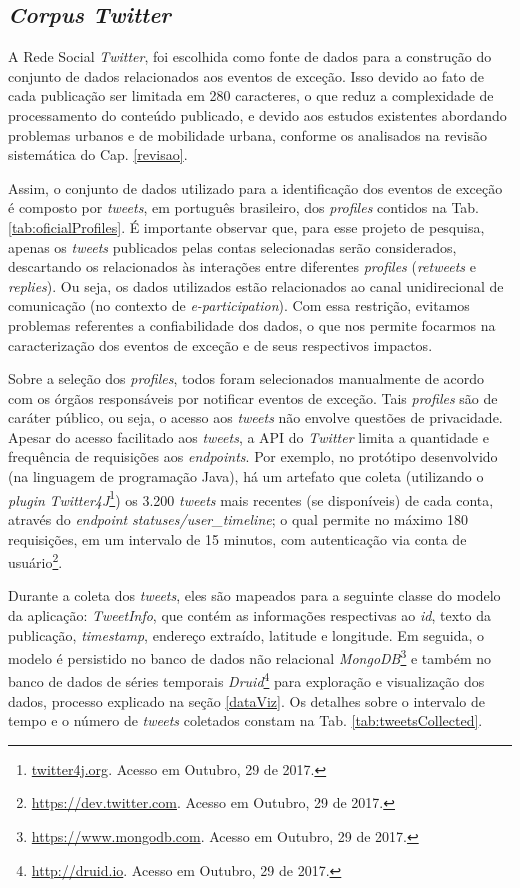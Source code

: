 \documentclass[
	12pt,				%
	oneside,			%
	a4paper,			%
	english,			%
	brazil				%
	]{abntex2ppgsi}
\begin{document}
{{\subsection{\textit{Corpus Twitter}}

A Rede Social \textit{Twitter}, foi escolhida como fonte de dados para a construção do conjunto de dados relacionados aos eventos de exceção. Isso devido ao fato de cada publicação ser limitada em 280 caracteres, o que reduz a complexidade de processamento do conteúdo publicado, e devido aos estudos existentes abordando problemas urbanos e de mobilidade urbana, conforme os analisados na revisão sistemática do Cap. \ref{revisao}.

Assim, o conjunto de dados utilizado para a identificação dos eventos de exceção é composto por \textit{tweets}, em português brasileiro, dos \textit{profiles} contidos na Tab. \ref{tab:oficialProfiles}. É importante observar que, para esse projeto de pesquisa, apenas os \textit{tweets} publicados pelas contas selecionadas serão considerados, descartando os relacionados às interações entre diferentes \textit{profiles} (\textit{retweets} e \textit{replies}). Ou seja, os dados utilizados estão relacionados ao canal unidirecional de comunicação (no contexto de \textit{e-participation}). Com essa restrição, evitamos problemas referentes a confiabilidade dos dados, o que nos permite focarmos na caracterização dos eventos de exceção e de seus respectivos impactos.

Sobre a seleção dos \textit{profiles}, todos foram selecionados manualmente de acordo com os órgãos responsáveis por notificar eventos de exceção. Tais \textit{profiles} são de caráter público, ou seja, o acesso aos \textit{tweets} não envolve questões de privacidade.
Apesar do acesso facilitado aos \textit{tweets}, a API do \textit{Twitter} limita a quantidade e frequência de requisições aos \textit{endpoints}. Por exemplo, no protótipo desenvolvido (na linguagem de programação Java), há um artefato que coleta (utilizando o \textit{plugin} \textit{Twitter4J}\footnote{\url{twitter4j.org}. Acesso em Outubro, 29 de 2017.}) os 3.200 \textit{tweets} mais recentes (se disponíveis) de cada conta, através do \textit{endpoint} \textit{statuses/user\_timeline}; o qual permite no máximo 180 requisições, em um intervalo de 15 minutos, com autenticação via conta de usuário\footnote{\url{https://dev.twitter.com}. Acesso em Outubro, 29 de 2017.}.

Durante a coleta dos \textit{tweets}, eles são mapeados para a seguinte classe do modelo da aplicação: \textit{TweetInfo}, que contém as informações respectivas ao \textit{id}, texto da publicação, \textit{timestamp}, endereço extraído, latitude e longitude. Em seguida, o modelo é persistido no banco de dados não relacional \textit{MongoDB}\footnote{\url{https://www.mongodb.com}. Acesso em Outubro, 29 de 2017.} e também no banco de dados de séries temporais \textit{Druid}\footnote{\url{http://druid.io}. Acesso em Outubro, 29 de 2017.} para exploração e visualização dos dados, processo explicado na seção \ref{dataViz}. Os detalhes sobre o intervalo de tempo e o número de \textit{tweets} coletados constam na Tab. \ref{tab:tweetsCollected}.

}}
\end{document}

